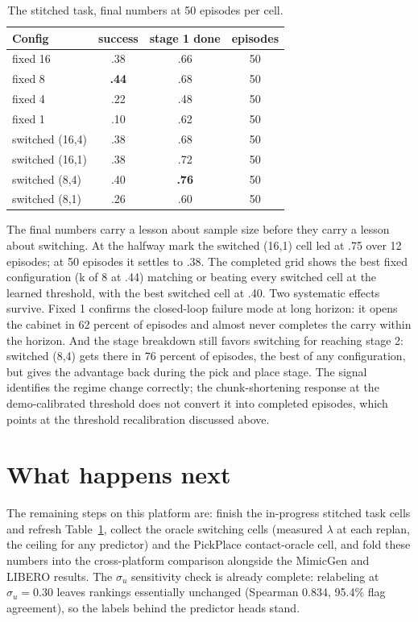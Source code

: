 \documentclass[11pt]{article}
\begin{document}
\begin{table}[h]
\centering
\small
\begin{tabular}{lccc}
\toprule
Config & success & stage 1 done & episodes \\
\midrule
fixed 16 & .38 & .66 & 50 \\
fixed 8  & \textbf{.44} & .68 & 50 \\
fixed 4  & .22 & .48 & 50 \\
fixed 1  & .10 & .62 & 50 \\
switched (16,4) & .38 & .68 & 50 \\
switched (16,1) & .38 & .72 & 50 \\
switched (8,4)  & .40 & \textbf{.76} & 50 \\
switched (8,1)  & .26 & .60 & 50 \\
\bottomrule
\end{tabular}
\caption{The stitched task, final numbers at 50 episodes per cell.}
\label{tab:sequence}
\end{table}

The final numbers carry a lesson about sample size before they carry a
lesson about switching. At the halfway mark the switched (16,1) cell led at
.75 over 12 episodes; at 50 episodes it settles to .38. The completed grid
shows the best fixed configuration (k of 8 at .44) matching or beating every
switched cell at the learned threshold, with the best switched cell at .40.
Two systematic effects survive. Fixed 1 confirms the closed-loop failure
mode at long horizon: it opens the cabinet in 62 percent of episodes and
almost never completes the carry within the horizon. And the stage
breakdown still favors switching for reaching stage 2: switched (8,4) gets
there in 76 percent of episodes, the best of any configuration, but gives
the advantage back during the pick and place stage. The signal identifies
the regime change correctly; the chunk-shortening response at the
demo-calibrated threshold does not convert it into completed episodes,
which points at the threshold recalibration discussed above.

\section{What happens next}

The remaining steps on this platform are: finish the in-progress stitched
task cells and refresh Table~\ref{tab:sequence}, collect the oracle
switching cells (measured $\lambda$ at each replan, the ceiling for any
predictor) and the PickPlace contact-oracle cell, and fold these numbers
into the cross-platform comparison alongside the MimicGen and LIBERO
results. The $\sigma_u$ sensitivity check is already complete: relabeling at
$\sigma_u = 0.30$ leaves rankings essentially unchanged (Spearman 0.834,
95.4\% flag agreement), so the labels behind the predictor heads stand.
\end{document}
